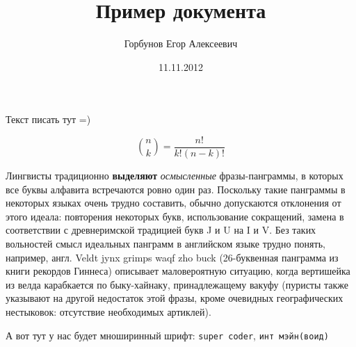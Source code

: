 


\title{Пример документа}
\author{Горбунов Егор Алексеевич}
\date{11.11.2012}


\maketitle

Текст писать тут =)

\begin{equation*}
\binom{n}{k}= \frac{n!}{k!(n-k)!}
\end{equation*}

Лингвисты традиционно \textbf{выделяют} \textit{осмысленные} фразы-панграммы, в которых все буквы алфавита встречаются ровно один раз. Поскольку такие панграммы в некоторых языках очень трудно составить, обычно допускаются отклонения от этого идеала: повторения некоторых букв, использование сокращений, замена в соответствии с древнеримской традицией букв J и U на I и V. Без таких вольностей смысл идеальных панграмм в английском языке трудно понять, например, англ. Veldt jynx grimps waqf zho buck (26-буквенная панграмма из книги рекордов Гиннеса) описывает маловероятную ситуацию, когда вертишейка из велда карабкается по быку-хайнаку, принадлежащему вакуфу (пуристы также указывают на другой недостаток этой фразы, кроме очевидных географических нестыковок: отсутствие необходимых артиклей).

А вот тут у нас будет мноширинный шрифт: \texttt{super coder}, \texttt{инт мэйн(воид)}



